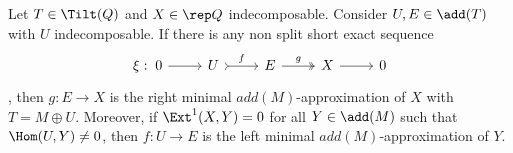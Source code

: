 \begin{lemma}
Let $T\in\Tilt(Q)$ and $X \in \rep Q$ indecomposable. Consider $U,E \in \add(T)$ with $U$ indecomposable. If there is any non split short exact sequence
\[
\begin{tikzcd}
\xi:\; 0 & U & E & X & 0
\arrow[from=1-1, to=1-2]
\arrow["f", tail, from=1-2, to=1-3]
\arrow["g", two heads, from=1-3, to=1-4]
\arrow[from=1-4, to=1-5]
\end{tikzcd}
\],
then $g: E \longrightarrow X$ is the right minimal $add(M)$-approximation of $X$ with $T=M \oplus U$.
Moreover, if $\Ext^1(X,Y)=0$ for all $Y \in \add(M)$ such that $\Hom(U,Y) \neq 0$, then $f : U \longrightarrow E$ is the left minimal $add(M)$-approximation of $Y$. 
\end{lemma}
